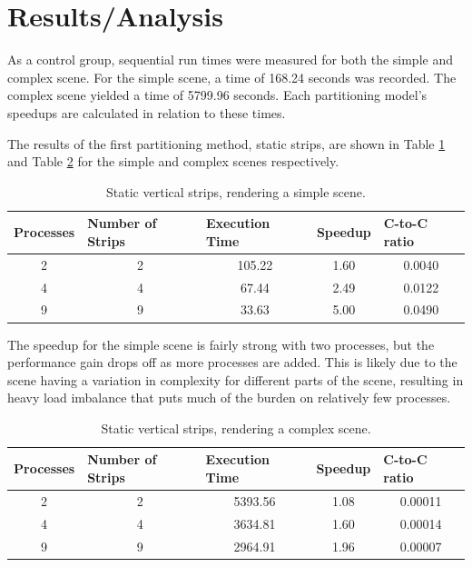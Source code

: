 \documentclass[CMPE]{KGCOEReport}
\begin{document}
\section*{Results/Analysis}

As a control group, sequential run times were measured for both the simple and complex scene. For 
the simple scene, a time of 168.24 seconds was recorded. The complex scene yielded a time 
of 5799.96 seconds. Each partitioning model's speedups are calculated in relation to these times.

The results of the first partitioning method, static strips, are shown in 
Table \ref{tab:static-strips-simple} and Table \ref{tab:static-strips-complex} for 
the simple and complex scenes respectively. \\

\begin{table}[!htpb]
\centering
\caption{\label{tab:static-strips-simple}Static vertical strips, rendering a simple scene.}
\begin{tabular}{ccccc}
\hline
\multicolumn{1}{l}{Processes} &
  \multicolumn{1}{l}{Number of Strips} &
  \multicolumn{1}{l}{Execution Time} &
  \multicolumn{1}{l}{Speedup} &
  \multicolumn{1}{l}{C-to-C ratio} \\ \hline
2 & 2 & 105.22 & 1.60 & 0.0040 \\
4 & 4 & 67.44  & 2.49 & 0.0122 \\
9 & 9 & 33.63  & 5.00 & 0.0490 \\
\end{tabular}
\end{table}

\vspace*{1mm}

The speedup for the simple scene is fairly strong with two processes, but the performance 
gain drops off as more processes are added. This is likely due to the scene having a 
variation in complexity for different parts of the scene, resulting in heavy load 
imbalance that puts much of the burden on relatively few processes. \\

\vspace*{1mm}

\begin{table}[!htpb]
\centering
\caption{\label{tab:static-strips-complex}Static vertical strips, rendering a complex scene.}
\begin{tabular}{ccccc}
\hline
\multicolumn{1}{l}{Processes} &
  \multicolumn{1}{l}{Number of Strips} &
  \multicolumn{1}{l}{Execution Time} &
  \multicolumn{1}{l}{Speedup} &
  \multicolumn{1}{l}{C-to-C ratio} \\ \hline
2 & 2 & 5393.56 & 1.08 & 0.00011 \\
4 & 4 & 3634.81 & 1.60 & 0.00014 \\
9 & 9 & 2964.91 & 1.96 & 0.00007 \\
\end{tabular}
\end{table}
\end{document}
